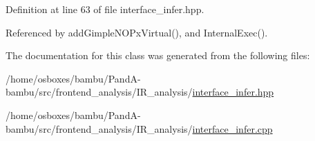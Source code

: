 Definition at line 63 of file interface\+\_\+infer.\+hpp.



Referenced by add\+Gimple\+N\+O\+Px\+Virtual(), and Internal\+Exec().



The documentation for this class was generated from the following files\+:\begin{DoxyCompactItemize}
\item 
/home/osboxes/bambu/\+Pand\+A-\/bambu/src/frontend\+\_\+analysis/\+I\+R\+\_\+analysis/\hyperlink{interface__infer_8hpp}{interface\+\_\+infer.\+hpp}\item 
/home/osboxes/bambu/\+Pand\+A-\/bambu/src/frontend\+\_\+analysis/\+I\+R\+\_\+analysis/\hyperlink{interface__infer_8cpp}{interface\+\_\+infer.\+cpp}\end{DoxyCompactItemize}
